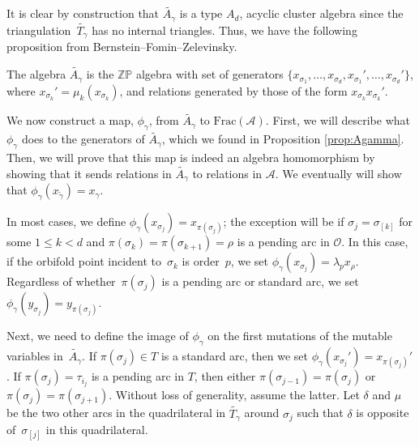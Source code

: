 It is clear by construction that $\widetilde{A_\gamma}$ is a type $A_d$, acyclic cluster algebra since the triangulation~$\widetilde{T_\gamma}$ has no internal triangles. Thus, we have the following proposition from Bernstein--Fomin--Zelevinsky.

\begin{Proposition} \label{prop:Agamma}The algebra $\widetilde{A_\gamma}$ is the $\mathbb{ZP}$ algebra with set of generators $\{x_{\sigma_1}, \ldots, x_{\sigma_d}, x_{\sigma_1}', \ldots, x_{\sigma_d}'\}$, where $x_{\sigma_k}' = \mu_k(x_{\sigma_k})$, and relations generated by those of the form $x_{\sigma_k}x_{\sigma_k}'$.
\end{Proposition}

We now construct a map, $\phi_\gamma$, from $\widetilde{A_\gamma}$ to $\text{Frac}(\mathcal{A})$. First, we will describe what $\phi_\gamma$ does to the generators of $\widetilde{A_\gamma}$, which we found in Proposition \ref{prop:Agamma}. Then, we will prove that this map is indeed an algebra homomorphism by showing that it sends relations in $\widetilde{A_\gamma}$ to relations in $\mathcal{A}$. We eventually will show that $\phi_\gamma(x_{\widetilde{\gamma}}) = x_\gamma$.

In most cases, we define $\phi_\gamma(x_{\sigma_j}) = x_{\pi(\sigma_j)}$; the exception will be if $\sigma_j = \sigma_{[k]}$ for some $1 \leq k < d$ and $\pi(\sigma_k) = \pi(\sigma_{k+1}) = \rho$ is a pending arc in $\mathcal{O}$. In this case, if the orbifold point incident to~$\sigma_k$ is order~$p$, we set $\phi_\gamma(x_{\sigma_j}) = \lambda_p x_\rho$.
Regardless of whether~$\pi(\sigma_j)$ is a pending arc or standard arc, we set $\phi_\gamma(y_{\sigma_j}) = y_{\pi(\sigma_j)}$.

Next, we need to define the image of $\phi_\gamma$ on the first mutations of the mutable variables in~$\widetilde{A_\gamma}$. If $\pi(\sigma_j) \in T$ is a standard arc, then we set $\phi_\gamma(x_{\sigma_j}') = x_{\pi(\sigma_j)}'$. If $\pi(\sigma_j) = \tau_{i_j}$ is a pending arc in $T$, then either $\pi(\sigma_{j-1}) = \pi(\sigma_j)$ or $\pi(\sigma_{j}) = \pi(\sigma_{j+1})$. Without loss of generality, assume the latter. Let $\delta$ and $\mu$ be the two other arcs in the quadrilateral in $\widetilde{T_\gamma}$ around $\sigma_j$ such that $\delta$ is opposite of~$\sigma_{[j]}$ in this quadrilateral.

